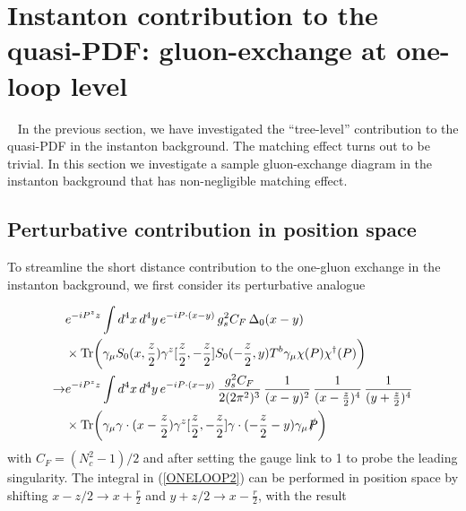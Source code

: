 \documentclass[11pt,aps,amsmath,amssymb,nofootinbib,notitlepage,longbibliography]{revtex4-1}
\begin{document}
\section{Instanton contribution to  the quasi-PDF: gluon-exchange at one-loop level}~\label{sec_loop}
In the previous section, we have investigated the ``tree-level'' contribution to the quasi-PDF in the instanton background. The matching effect turns out to be trivial. In this section we investigate a sample gluon-exchange diagram in the instanton background that has non-negligible matching effect.
\subsection{Perturbative contribution in position space}


To streamline the short distance contribution to the one-gluon exchange in the instanton background, we first consider its perturbative analogue

\begin{align}\label{ONELOOP2}
&e^{-iP^zz}\int d^4x \,d^4y\,e^{-iP\cdot (x-y)}\,g_s^2C_F\,\Delta_0(x-y)\,\nonumber\\
&\times{\rm Tr}\bigg(\gamma_\mu S_0(x, \frac z2)\gamma^z[\frac{z}{2},-\frac{z}{2}]
S_0(-\frac z2, y)T^b\gamma_\mu \chi(P)\chi^\dagger(P)\bigg)\nonumber\\
\rightarrow &e^{-iP^zz}\int d^4x \,d^4y\,e^{-iP\cdot (x-y)}\,\frac{g_s^2C_F}{2(2\pi^2)^3}\,\frac 1{(x-y)^2}\,\frac 1{(x-\frac z2)^4}\,\frac 1{(y+\frac z2)^4}\nonumber\\
&\times{\rm Tr}\bigg(\gamma_\mu \gamma\cdot (x-\frac z2)\gamma^z[\frac{z}{2},-\frac{z}{2}]
\gamma\cdot (-\frac z2-y)\gamma_\mu\slashed P\bigg)
\end{align}
with $C_F=(N_c^2-1)/2$ and after setting the gauge link to 1 to probe the leading singularity.
The  integral in (\ref{ONELOOP2})  can be performed in position space by shifting  $x-z/2\rightarrow x+\frac{r}{2}$ and $y+z/2\rightarrow x-\frac{r}{2}$,
with the result
\end{document}
